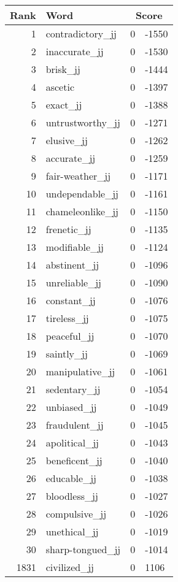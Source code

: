\begin{longtable}[!htbp]{| rlr@{.}l |}
    \hline
    \textbf{Rank} & \textbf{Word} & \multicolumn{2}{c|}{\textbf{Score}} \\
    \hline
    \endhead
    1 & contradictory\_jj & 0 & -1550 \\
    2 & inaccurate\_jj & 0 & -1530 \\
    3 & brisk\_jj & 0 & -1444 \\
    4 & ascetic & 0 & -1397 \\
    5 & exact\_jj & 0 & -1388 \\
    6 & untrustworthy\_jj & 0 & -1271 \\
    7 & elusive\_jj & 0 & -1262 \\
    8 & accurate\_jj & 0 & -1259 \\
    9 & fair-weather\_jj & 0 & -1171 \\
    10 & undependable\_jj & 0 & -1161 \\
    11 & chameleonlike\_jj & 0 & -1150 \\
    12 & frenetic\_jj & 0 & -1135 \\
    13 & modifiable\_jj & 0 & -1124 \\
    14 & abstinent\_jj & 0 & -1096 \\
    15 & unreliable\_jj & 0 & -1090 \\
    16 & constant\_jj & 0 & -1076 \\
    17 & tireless\_jj & 0 & -1075 \\
    18 & peaceful\_jj & 0 & -1070 \\
    19 & saintly\_jj & 0 & -1069 \\
    20 & manipulative\_jj & 0 & -1061 \\
    21 & sedentary\_jj & 0 & -1054 \\
    22 & unbiased\_jj & 0 & -1049 \\
    23 & fraudulent\_jj & 0 & -1045 \\
    24 & apolitical\_jj & 0 & -1043 \\
    25 & beneficent\_jj & 0 & -1040 \\
    26 & educable\_jj & 0 & -1038 \\
    27 & bloodless\_jj & 0 & -1027 \\
    28 & compulsive\_jj & 0 & -1026 \\
    29 & unethical\_jj & 0 & -1019 \\
    30 & sharp-tongued\_jj & 0 & -1014 \\
    1831 & civilized\_jj & 0 & 1106 \\

\end{longtable}
